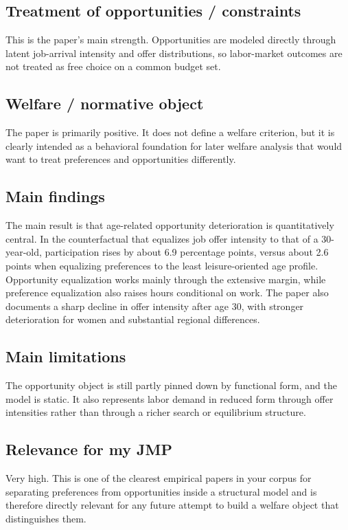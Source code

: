 \documentclass[11pt,a4paper]{article}
\begin{document}
\subsection*{Treatment of opportunities / constraints}
This is the paper’s main strength. Opportunities are modeled directly through latent job-arrival intensity and offer distributions, so labor-market outcomes are not treated as free choice on a common budget set.

\subsection*{Welfare / normative object}
The paper is primarily positive. It does not define a welfare criterion, but it is clearly intended as a behavioral foundation for later welfare analysis that would want to treat preferences and opportunities differently.

\subsection*{Main findings}
The main result is that age-related opportunity deterioration is quantitatively central. In the counterfactual that equalizes job offer intensity to that of a 30-year-old, participation rises by about 6.9 percentage points, versus about 2.6 points when equalizing preferences to the least leisure-oriented age profile. Opportunity equalization works mainly through the extensive margin, while preference equalization also raises hours conditional on work. The paper also documents a sharp decline in offer intensity after age 30, with stronger deterioration for women and substantial regional differences.

\subsection*{Main limitations}
The opportunity object is still partly pinned down by functional form, and the model is static. It also represents labor demand in reduced form through offer intensities rather than through a richer search or equilibrium structure.

\subsection*{Relevance for my JMP}
Very high. This is one of the clearest empirical papers in your corpus for separating preferences from opportunities inside a structural model and is therefore directly relevant for any future attempt to build a welfare object that distinguishes them.
\end{document}
